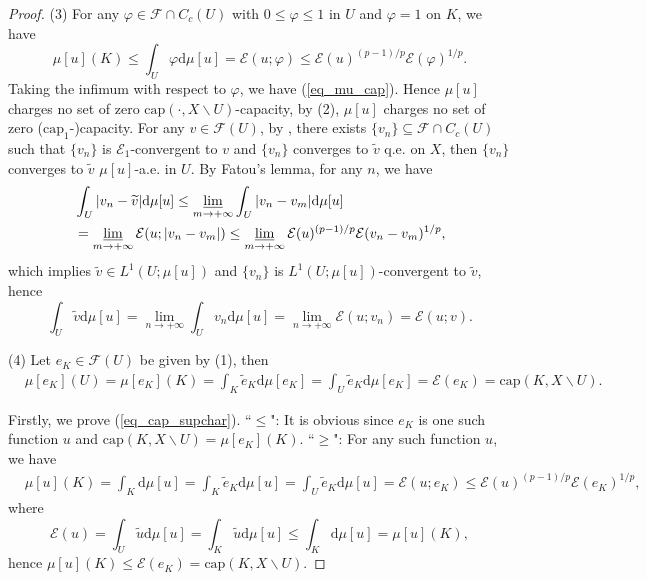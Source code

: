 \documentclass[11pt,a4paper]{article}
\numberwithin{equation}{section}
\theoremstyle{plain}
\theoremstyle{definition}
\begin{document}
\begin{proof}
(3) For any $\varphi\in\mathcal{F}\cap C_c(U)$ with $0\le\varphi\le1$ in $U$ and $\varphi=1$ on ${K}$, we have
$$\mu[u]({K})\le\int_U\varphi\mathrm{d}\mu[u]=\mathcal{E}(u;\varphi)\le\mathcal{E}(u)^{(p-1)/p}\mathcal{E}(\varphi)^{1/p}.$$
Taking the infimum with respect to $\varphi$, we have (\ref{eq_mu_cap}). Hence $\mu[u]$ charges no set of zero $\mathrm{cap}(\cdot,X\backslash U)$-capacity, by (2), $\mu[u]$ charges no set of zero ($\mathrm{cap}_1$-)capacity. For any $v\in\mathcal{F}(U)$, by \cite[Proposition 8.5]{Yan25a}, there exists $\{v_n\}\subseteq\mathcal{F}\cap C_c(U)$ such that $\{v_n\}$ is $\mathcal{E}_1$-convergent to $v$ and $\{v_n\}$ converges to $\widetilde{v}$ q.e. on $X$, then $\{v_n\}$ converges to $\widetilde{v}$ $\mu[u]$-a.e. in $U$. By Fatou's lemma, for any $n$, we have
\begin{align*}
&\int_U|v_n-\widetilde{v}|\mathrm{d}\mu[u]\le\varliminf_{m\to+\infty}\int_U|v_n-v_m|\mathrm{d}\mu[u]\\
&=\varliminf_{m\to+\infty}\mathcal{E}(u;|v_n-v_m|)\le\varliminf_{m\to+\infty}\mathcal{E}(u)^{(p-1)/p}\mathcal{E}(v_n-v_m)^{1/p},
\end{align*}
which implies $\widetilde{v}\in L^1(U;\mu[u])$ and $\{v_n\}$ is $L^1(U;\mu[u])$-convergent to $\widetilde{v}$, hence
$$\int_U\widetilde{v}\mathrm{d}\mu[u]=\lim_{n\to+\infty}\int_Uv_n\mathrm{d}\mu[u]=\lim_{n\to+\infty}\mathcal{E}(u;v_n)=\mathcal{E}(u;v).$$

(4) Let $e_K\in\mathcal{F}(U)$ be given by (1), then
\begin{align*}
&\mu[e_K](U)=\mu[e_K](K)=\int_K\widetilde{e}_K\mathrm{d}\mu[e_K]=\int_U\widetilde{e}_K\mathrm{d}\mu[e_K]=\mathcal{E}(e_K)=\mathrm{cap}(K,X\backslash U).
\end{align*}

Firstly, we prove (\ref{eq_cap_supchar}). ``$\le$": It is obvious since $e_K$ is one such function $u$ and $\mathrm{cap}(K,X\backslash U)=\mu[e_K](K)$. ``$\ge$": For any such function $u$, we have
\begin{align*}
&\mu[u](K)=\int_K\mathrm{d}\mu[u]=\int_K\widetilde{e}_K\mathrm{d}\mu[u]=\int_U\widetilde{e}_K\mathrm{d}\mu[u]=\mathcal{E}(u;e_K)\le\mathcal{E}(u)^{(p-1)/p}\mathcal{E}(e_K)^{1/p},
\end{align*}
where
$$\mathcal{E}(u)=\int_U\widetilde{u}\mathrm{d}\mu[u]=\int_K\widetilde{u}\mathrm{d}\mu[u]\le\int_K\mathrm{d}\mu[u]=\mu[u](K),$$
hence $\mu[u](K)\le\mathcal{E}(e_K)=\mathrm{cap}(K,X\backslash U)$.


\end{proof}
\end{document}
